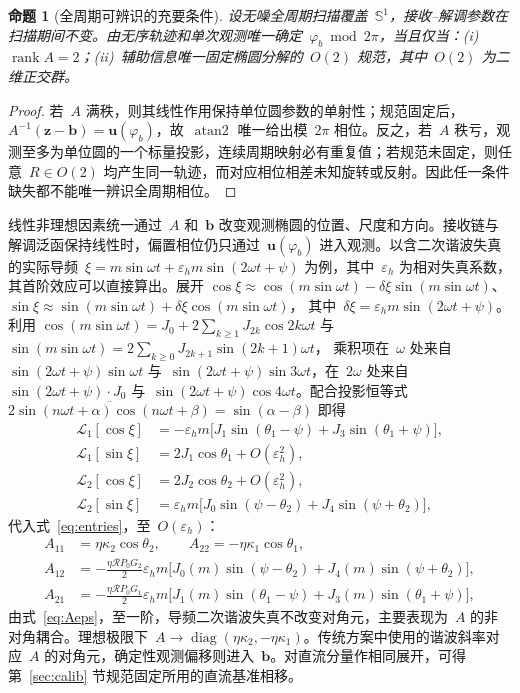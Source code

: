 \documentclass[journal]{IEEEtran}
\theoremstyle{plain}
\newtheorem{proposition}{命题}
\theoremstyle{remark}
\newcommand{\zv}{\mathbf{z}}
\newcommand{\uv}{\mathbf{u}}
\newcommand{\bv}{\mathbf{b}}
\newcommand{\Lc}{\mathcal{L}}
\newcommand{\atan}{\operatorname{atan2}}
\begin{document}
\begin{proposition}[全周期可辨识的充要条件]
\label{prop:ident}
设无噪全周期扫描覆盖~$\mathbb{S}^1$，接收--解调参数在扫描期间不变。由无序轨迹和单次观测唯一确定~$\varphi_b\bmod 2\pi$，当且仅当：(i)~$\operatorname{rank}A=2$；(ii)~辅助信息唯一固定椭圆分解的~$O(2)$ 规范，其中~$O(2)$ 为二维正交群。
\end{proposition}
\begin{proof}
若~$A$ 满秩，则其线性作用保持单位圆参数的单射性；规范固定后，$A^{-1}(\zv-\bv)=\uv(\varphi_b)$，故~$\atan$ 唯一给出模~$2\pi$ 相位。反之，若~$A$ 秩亏，观测至多为单位圆的一个标量投影，连续周期映射必有重复值；若规范未固定，则任意~$R\in O(2)$ 均产生同一轨迹，而对应相位相差未知旋转或反射。因此任一条件缺失都不能唯一辨识全周期相位。
\end{proof}

线性非理想因素统一通过~$A$ 和~$\bv$ 改变观测椭圆的位置、尺度和方向。接收链与解调泛函保持线性时，偏置相位仍只通过~$\uv(\varphi_b)$ 进入观测。以含二次谐波失真的实际导频~$\xi=m\sin\omega t+\varepsilon_h m\sin(2\omega t+\psi)$ 为例，其中~$\varepsilon_h$ 为相对失真系数，其首阶效应可以直接算出。展开
$\cos\xi\approx\cos(m\sin\omega t)-\delta\xi\sin(m\sin\omega t)$、
$\sin\xi\approx\sin(m\sin\omega t)+\delta\xi\cos(m\sin\omega t)$，
其中~$\delta\xi=\varepsilon_h m\sin(2\omega t+\psi)$。利用
$\cos(m\sin\omega t)=J_0+2\sum_{k\ge1}J_{2k}\cos2k\omega t$ 与
$\sin(m\sin\omega t)=2\sum_{k\ge0}J_{2k+1}\sin(2k{+}1)\omega t$，
乘积项在~$\omega$ 处来自~$\sin(2\omega t{+}\psi)\sin\omega t$ 与~$\sin(2\omega t{+}\psi)\sin3\omega t$，在~$2\omega$ 处来自~$\sin(2\omega t{+}\psi)\cdot J_0$ 与~$\sin(2\omega t{+}\psi)\cos4\omega t$。配合投影恒等式
$\overline{2\sin(n\omega t{+}\alpha)\cos(n\omega t{+}\beta)}=\sin(\alpha-\beta)$
即得
\begin{align}
\Lc_1[\cos\xi]&=-\varepsilon_h m\bigl[J_1\sin(\theta_1{-}\psi)
+J_3\sin(\theta_1{+}\psi)\bigr],\nonumber\\
\Lc_1[\sin\xi]&=2J_1\cos\theta_1+O(\varepsilon_h^2),\nonumber\\
\Lc_2[\cos\xi]&=2J_2\cos\theta_2+O(\varepsilon_h^2),\nonumber\\
\Lc_2[\sin\xi]&=\varepsilon_h m\bigl[J_0\sin(\psi{-}\theta_2)
+J_4\sin(\psi{+}\theta_2)\bigr],
\end{align}
代入式~\eqref{eq:entries}，至~$O(\varepsilon_h)$：
\begin{align}
A_{11}&=\eta\kappa_2\cos\theta_2, \qquad A_{22}=-\eta\kappa_1\cos\theta_1,\nonumber\\
A_{12}&=-\tfrac{\eta\mathcal{R} P_0G_2}{2}\varepsilon_h m
\bigl[J_0(m)\sin(\psi{-}\theta_2)+J_4(m)\sin(\psi{+}\theta_2)\bigr],\nonumber\\
A_{21}&=-\tfrac{\eta\mathcal{R} P_0G_1}{2}\varepsilon_h m
\bigl[J_1(m)\sin(\theta_1{-}\psi)+J_3(m)\sin(\theta_1{+}\psi)\bigr],
\label{eq:Aeps}
\end{align}
由式~\eqref{eq:Aeps}，至一阶，导频二次谐波失真不改变对角元，主要表现为~$A$ 的非对角耦合。理想极限下~$A\to\operatorname{diag}(\eta\kappa_2,-\eta\kappa_1)$。传统方案中使用的谐波斜率对应~$A$ 的对角元，确定性观测偏移则进入~$\bv$。对直流分量作相同展开，可得第~\ref{sec:calib} 节规范固定所用的直流基准相移。
\end{document}
